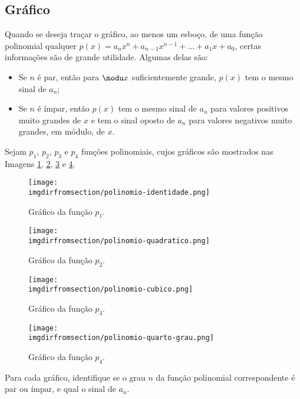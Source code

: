 \subsection{Gráfico}
\label{sec:grafico-funcao-polinomial}

Quando se deseja traçar o gráfico, ao menos um esboço, de uma função polinomial qualquer 
$p(x) = a_n x^n+ a_{n-1} x^{n-1} + \dots + a_1x + a_0$, certas informações são de grande utilidade. 
Algumas delas são:
%
\begin{itemize}
  \item Se $n$ é par, então para $\modu x $ suficientemente grande,
  $p(x)$ tem o mesmo sinal de $a_n$;
  \item Se $n$ é ímpar, então $p(x)$ tem o mesmo sinal de $a_n$ para
  valores positivos  muito grandes de $x$ e tem o sinal oposto de
  $a_n$ para valores negativos muito grandes, em módulo, de $x$.
\end{itemize}

\begin{example}
Sejam $p_1$, $p_2$, $p_3$ e $p_4$ funções polinomiais, cujos gráficos são mostrados nas Imagens
\ref{fig:polinomio-identidade}, \ref{fig:polinomio-quadratico}, \ref{fig:polinomio-cubico} e \ref{fig:polinomio-quartico}.

\begin{figure}[H]
  \centering\texttt{[image: \\imgdirfromsection/polinomio-identidade.png]}
  \caption{Gráfico da função $p_1$.}
  \label{fig:polinomio-identidade}
\end{figure}

\begin{figure}[H]
  \centering\texttt{[image: \\imgdirfromsection/polinomio-quadratico.png]}
  \caption{Gráfico da função $p_2$.}
  \label{fig:polinomio-quadratico}
\end{figure}

\begin{figure}[H]
  \centering\texttt{[image: \\imgdirfromsection/polinomio-cubico.png]}
  \caption{Gráfico da função $p_3$.}
  \label{fig:polinomio-cubico}
\end{figure}

\begin{figure}[H]
  \centering\texttt{[image: \\imgdirfromsection/polinomio-quarto-grau.png]}
  \caption{Gráfico da função $p_4$.}
  \label{fig:polinomio-quartico}
\end{figure}

Para cada gráfico, identifique se o grau $n$ da função polinomial correspondente é par ou ímpar, e qual o sinal 
de $a_n$.
\end{example}

